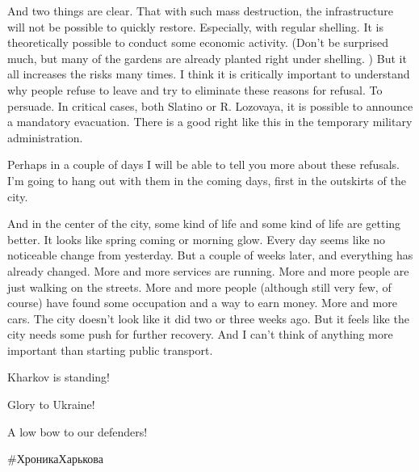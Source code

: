 And two things are clear. That with such mass destruction, the infrastructure
will not be possible to quickly restore. Especially, with regular shelling. It
is theoretically possible to conduct some economic activity. (Don't be
surprised much, but many of the gardens are already planted right under
shelling. ) But it all increases the risks many times. I think it is critically
important to understand why people refuse to leave and try to eliminate these
reasons for refusal. To persuade. In critical cases, both Slatino or R.
Lozovaya, it is possible to announce a mandatory evacuation. There is a good
right like this in the temporary military administration.

Perhaps in a couple of days I will be able to tell you more about these
refusals. I'm going to hang out with them in the coming days, first in the
outskirts of the city.

And in the center of the city, some kind of life and some kind of life are
getting better. It looks like spring coming or morning glow. Every day seems
like no noticeable change from yesterday. But a couple of weeks later, and
everything has already changed. More and more services are running. More and
more people are just walking on the streets. More and more people (although
still very few, of course) have found some occupation and a way to earn money.
More and more cars. The city doesn't look like it did two or three weeks ago.
But it feels like the city needs some push for further recovery. And I can't
think of anything more important than starting public transport.

Kharkov is standing!

Glory to Ukraine!

A low bow to our defenders!

\#ХроникаХарькова

